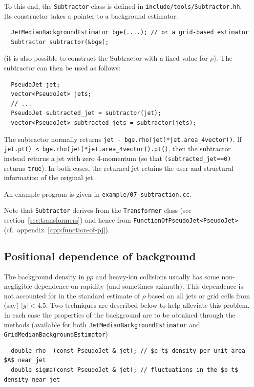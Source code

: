 \documentclass[12pt,a4]{article}
\newcommand{\ttt}[1]{{\small\texttt{#1}}}
\begin{document}
To this end, the \ttt{Subtractor} class is defined in
\ttt{include/tools/Subtractor.hh}. Its constructor takes a pointer to
a background estimator:
\begin{lstlisting}
  JetMedianBackgroundEstimator bge(....); // or a grid-based estimator
  Subtractor subtractor(&bge);
\end{lstlisting}
(it is also possible to construct the Subtractor with a fixed value
for $\rho$).
%
The subtractor can then be used as follows:
\begin{lstlisting}
  PseudoJet jet;
  vector<PseudoJet> jets;
  // ...
  PseudoJet subtracted_jet = subtractor(jet);
  vector<PseudoJet> subtracted_jets = subtractor(jets);
\end{lstlisting}
The subtractor normally returns \ttt{jet - bge.rho(jet)*jet.area\_4vector()}.
%
If \ttt{jet.pt() < bge.rho(jet)*jet.area\_4vector().pt()}, then
the subtractor instead returns a jet with zero 4-momentum (so that
\ttt{(subtracted\_jet==0)} returns \ttt{true}).
%
In both cases, the returned jet retains the user and structural
information of the original jet.

An example program is given in \ttt{example/07-subtraction.cc}.

Note that \ttt{Subtractor} derives from the \ttt{Transformer} class (see
section~\ref{sec:transformers}) and hence from 
\ttt{FunctionOfPseudoJet<PseudoJet>} (cf.\
appendix~\ref{app:function-of-pj}).



\subsection{Positional dependence of background}
\label{sec:BGE-positional}

The background density in $pp$ and heavy-ion collisions usually has
some non-negligible dependence on rapidity (and sometimes azimuth).
%
This dependence is not accounted for in the standard estimate of
$\rho$ based on all jets or grid cells from (say) $|y|<4.5$.
%
Two techniques are described below to help alleviate this problem.
%
In each case the properties of the background are to be obtained
through the methods (available for both
\ttt{JetMedianBackgroundEstimator} and
\ttt{GridMedianBackgroundEstimator})
\begin{lstlisting}
  double rho  (const PseudoJet & jet); // $p_t$ density per unit area $A$ near jet
  double sigma(const PseudoJet & jet); // fluctuations in the $p_t$ density near jet
\end{lstlisting}
\end{document}
